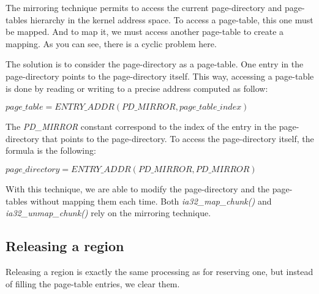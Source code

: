 The mirroring technique permits to access the current page-directory
and page-tables hierarchy in the kernel address space. To access a
page-table, this one must be mapped. And to map it, we must access
another page-table to create a mapping. As you can see, there is a
cyclic problem here.

The solution is to consider the page-directory as a page-table. One
entry in the page-directory points to the page-directory itself. This
way, accessing a page-table is done by reading or writing to a precise
address computed as follow:

$page\_table = ENTRY\_ADDR(PD\_MIRROR, page\_table\_index)$

The \textit{PD\_MIRROR} constant correspond to the index of the entry
in the page-directory that points to the page-directory. To access the
page-directory itself, the formula is the following:

$page\_directory = ENTRY\_ADDR(PD\_MIRROR, PD\_MIRROR)$

With this technique, we are able to modify the page-directory and the
page-tables without mapping them each time. Both
\textit{ia32\_map\_chunk()} and \textit{ia32\_unmap\_chunk()} rely on
the mirroring technique.

%
%

\subsection{Releasing a region}

Releasing a region is exactly the same processing as for reserving
one, but instead of filling the page-table entries, we clear them.


